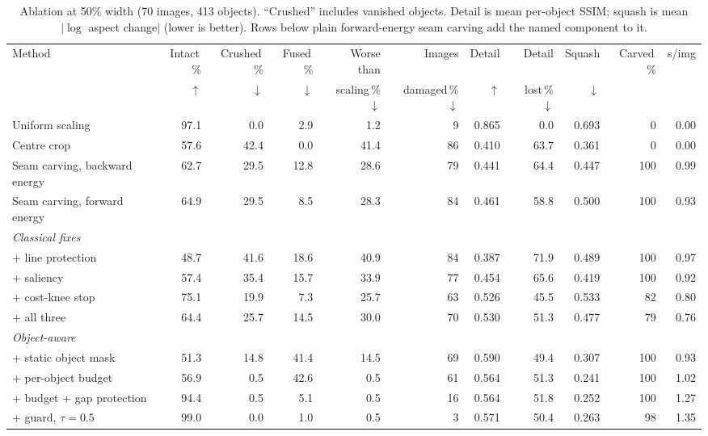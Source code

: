 \documentclass[conference]{IEEEtran}
\begin{document}
\begin{table}[t]
\centering
\caption{Ablation at 50\% width (70 images, 413 objects). ``Crushed'' includes vanished objects. Detail is mean per-object SSIM; squash is mean $|\log$ aspect change$|$ (lower is better). Rows below plain forward-energy seam carving add the named component to it.}
\label{tab:main}
\setlength{\tabcolsep}{3.5pt}
\begin{tabular}{lrrrrrrrrrr}
\toprule
Method & Intact\,\% & Crushed\,\% & Fused\,\% & Worse than & Images & Detail & Detail & Squash & Carved\,\% & s/img \\
 & $\uparrow$ & $\downarrow$ & $\downarrow$ & scaling\,\% $\downarrow$ & damaged\,\% $\downarrow$ & $\uparrow$ & lost\,\% $\downarrow$ & $\downarrow$ & & \\
\midrule
Uniform scaling & 97.1 & 0.0 & 2.9 & 1.2 & 9 & 0.865 & 0.0 & 0.693 & 0 & 0.00 \\
Centre crop & 57.6 & 42.4 & 0.0 & 41.4 & 86 & 0.410 & 63.7 & 0.361 & 0 & 0.00 \\
Seam carving, backward energy & 62.7 & 29.5 & 12.8 & 28.6 & 79 & 0.441 & 64.4 & 0.447 & 100 & 0.99 \\
Seam carving, forward energy & 64.9 & 29.5 & 8.5 & 28.3 & 84 & 0.461 & 58.8 & 0.500 & 100 & 0.93 \\
\midrule
\multicolumn{11}{l}{\emph{Classical fixes}} \\
\quad + line protection & 48.7 & 41.6 & 18.6 & 40.9 & 84 & 0.387 & 71.9 & 0.489 & 100 & 0.97 \\
\quad + saliency & 57.4 & 35.4 & 15.7 & 33.9 & 77 & 0.454 & 65.6 & 0.419 & 100 & 0.92 \\
\quad + cost-knee stop & 75.1 & 19.9 & 7.3 & 25.7 & 63 & 0.526 & 45.5 & 0.533 & 82 & 0.80 \\
\quad + all three & 64.4 & 25.7 & 14.5 & 30.0 & 70 & 0.530 & 51.3 & 0.477 & 79 & 0.76 \\
\midrule
\multicolumn{11}{l}{\emph{Object-aware}} \\
\quad + static object mask & 51.3 & 14.8 & 41.4 & 14.5 & 69 & 0.590 & 49.4 & 0.307 & 100 & 0.93 \\
\quad + per-object budget & 56.9 & 0.5 & 42.6 & 0.5 & 61 & 0.564 & 51.3 & 0.241 & 100 & 1.02 \\
\quad + budget + gap protection & 94.4 & 0.5 & 5.1 & 0.5 & 16 & 0.564 & 51.8 & 0.252 & 100 & 1.27 \\
\quad + guard, $\tau = 0.5$ & 99.0 & 0.0 & 1.0 & 0.5 & 3 & 0.571 & 50.4 & 0.263 & 98 & 1.35 \\

\end{tabular}
\end{table}
\end{document}
